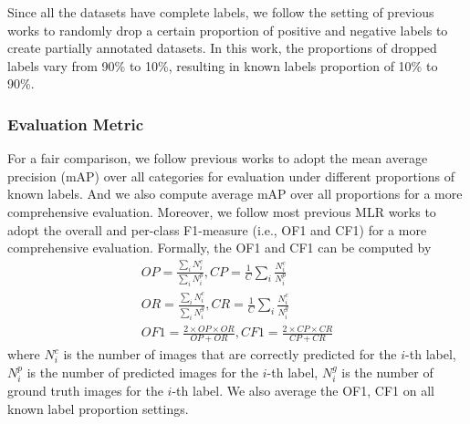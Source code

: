 \documentclass[lettersize,journal]{IEEEtran}
\begin{document}
Since all the datasets have complete labels, we follow the setting of previous works \cite{Durand2019CVPR, Huynh2020CVPR} to randomly drop a certain proportion of positive and negative labels to create partially annotated datasets. In this work, the proportions of dropped labels vary from 90\% to 10\%, resulting in known labels proportion of 10\% to 90\%. 

\subsubsection{Evaluation Metric} For a fair comparison, we follow previous works \cite{Durand2019CVPR, Huynh2020CVPR} to adopt the mean average precision (mAP) over all categories for evaluation under different proportions of known labels. And we also compute average mAP over all proportions for a more comprehensive evaluation. Moreover, we follow most previous MLR works \cite{Chen2019SSGRL} to adopt the overall and per-class F1-measure (i.e., OF1 and CF1) for a more comprehensive evaluation. Formally, the OF1 and CF1 can be computed by
\begin{gather}
 OP=\frac{\sum_{i}{N^c_i}}{\sum_{i}{N^p_i}}, CP=\frac{1}{C} \sum_{i}{ \frac{N^c_i}{N^p_i} } \\
 OR=\frac{\sum_{i}{N^c_i}}{\sum_{i}{N^g_i}}, CR=\frac{1}{C} \sum_{i}{ \frac{N^c_i}{N^g_i} } \\
 OF1=\frac{2 \times OP \times OR }{OP+OR},  CF1=\frac{2 \times CP \times CR }{CP+CR}
\end{gather}
where $N^c_i$ is the number of images that are correctly predicted for the $i$-th label, $N^p_i$ is the number of predicted images for the $i$-th label, $N^g_i$ is the number of ground truth images for the $i$-th label. We also average the OF1, CF1 on all known label proportion settings.
\end{document}
